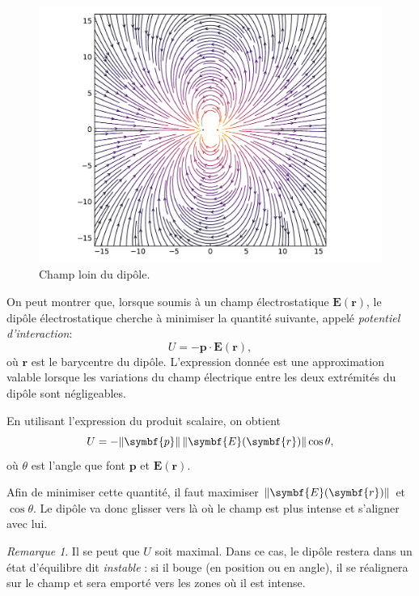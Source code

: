 \documentclass{article}
\newcommand{\vv}[1]{\symbf{#1}}
\DeclarePairedDelimiter{\norm}{\lVert}{\rVert}
\theoremstyle{definition}
\theoremstyle{remark}
\newtheorem*{rem}{Remarque}
\begin{document}
\begin{figure}[h]
	\centering
	\includegraphics[width=\textwidth]{parts/electrostat/Champ_dipole_loin.pdf}
	\caption{Champ loin du dipôle.}
\end{figure}

On peut montrer que, lorsque soumis à un champ électrostatique $\vv{E}(\vv{r})$, le dipôle électrostatique cherche à minimiser la quantité suivante, appelé \textit{potentiel d'interaction}:
\[ U = -\vv{p}\cdot\vv{E}(\vv{r}), \]
où $\vv{r}$ est le barycentre du dipôle. L'expression donnée est une approximation valable lorsque les variations du champ électrique entre les deux extrémités du dipôle sont négligeables.


En utilisant l'expression du produit scalaire, on obtient
	\[ U = - \norm{\vv{p}}\,\norm{\vv{E}(\vv{r})}\cos\theta, \]
où $\theta$ est l'angle que font $\vv{p}$ et $\vv{E}(\vv{r})$.

Afin de minimiser cette quantité, il faut maximiser $\norm{\vv{E}(\vv{r})}$ et $\cos\theta$. Le dipôle va donc glisser vers là où le champ est plus intense et s'aligner avec lui. 

\begin{rem}
Il se peut que $U$ soit maximal. Dans ce cas, le dipôle restera dans un état d'équilibre dit \textit{instable} : si il bouge (en position ou en angle), il se réalignera sur le champ et sera emporté vers les zones où il est intense.
\end{rem}
\end{document}
